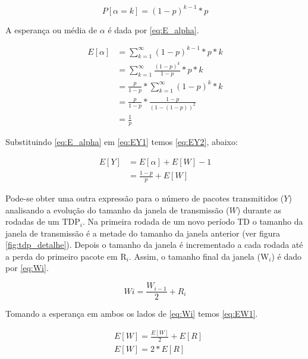 \begin{equation} \label{eq:P_alpha}
P[\alpha=k]=(1 - p)^{k - 1} * p
\end{equation}

A esperança ou média de $\alpha$ é dada por \eqref{eq:E_alpha}.

\begin{align} \label{eq:E_alpha}
\nonumber E[\alpha] &= \sum_{k=1}^\infty (1 - p)^{k - 1} * p * k \\
\nonumber &= \sum_{k=1}^\infty \frac{(1 - p)^{k}}{1 - p} * p * k\\ 
\nonumber &= \frac{p}{1 - p} * \sum_{k=1}^\infty (1 - p)^k * k \\ 
\nonumber &= \frac{p}{1 - p} * \frac{1 - p}{(1 - (1 - p))^2} \\
&= \frac{1}{p}
\end{align}

Substituindo \eqref{eq:E_alpha} em \eqref{eq:EY1} temos \eqref{eq:EY2}, abaixo:

\begin{align} \label{eq:EY2}
\nonumber E[Y] &= E[\alpha] + E[W] - 1 \\
&= \frac{1 - p}{p} + E[W]
\end{align}

Pode-se obter uma outra expressão para o número de pacotes transmitidos ($Y$) analisando
a evolução do tamanho da janela de transmissão ($W$) durante as rodadas de um TDP$_i$.
Na primeira rodada de um novo período TD o tamanho da janela de transmissão é a metade
do tamanho da janela anterior (ver figura \ref{fig:tdp_detalhe}). Depois o tamanho da janela
é incrementado a cada rodada até a perda do primeiro pacote em R{$_i$}. Assim, o tamanho 
final da janela (W$_i$) é dado por \eqref{eq:Wi}.

\begin{equation} \label{eq:Wi}
Wi=\frac{W_{i-1}}{2} + R_i
\end{equation}

Tomando a esperança em ambos os lados de \eqref{eq:Wi} temos \eqref{eq:EW1}.

\begin{align} \label{eq:EW1}
\nonumber & E[W]=\frac{E[W]}{2} + E[R] \\
& E[W]= 2 * E[R]
\end{align}
